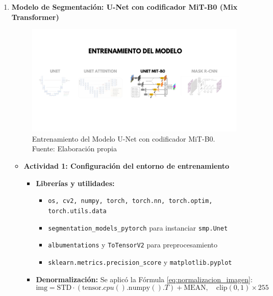\begin{enumerate}
\begin{itemize}
  \end{itemize}
\newpage
  \item \textbf{Modelo de Segmentación: U-Net con codificador MiT-B0 (Mix Transformer)}
  \begin{figure}[H]
	\begin{center}
		\includegraphics[width=1\textwidth]{4/figures/entrunetmit.png}
		\caption[Entrenamiento del Modelo U-Net con codificador MiT-B0]{Entrenamiento del Modelo U-Net con codificador MiT-B0.\\
		Fuente: Elaboración propia}
		\label{4:figentunetmit}
	\end{center}
\end{figure}
  \begin{itemize}
  \item\textbf{Actividad 1: Configuración del entorno de entrenamiento}
  \begin{itemize}
    \item \textbf{Librerías y utilidades:}
      \begin{itemize}
        \item \texttt{os, cv2, numpy, torch, torch.nn, torch.optim, torch.utils.data}
        \item \texttt{segmentation\_models\_pytorch} para instanciar \texttt{smp.Unet}
        \item \texttt{albumentations} y \texttt{ToTensorV2} para preprocesamiento
        \item \texttt{sklearn.metrics.precision\_score} y \texttt{matplotlib.pyplot}
      \end{itemize}
  
    \item \textbf{Denormalización:}
    Se aplicó la Fórmula \ref{eq:normalizacion_imagen}:
    \begin{equation}\label{eq:normalizacion_imagen}
      \text{img} = \text{STD} \cdot (\text{tensor}.cpu().\text{numpy}().T) + \text{MEAN},\quad \text{clip}(0,1) \times 255
  \end{equation}
  

\end{itemize}
\end{itemize}
\end{enumerate}
